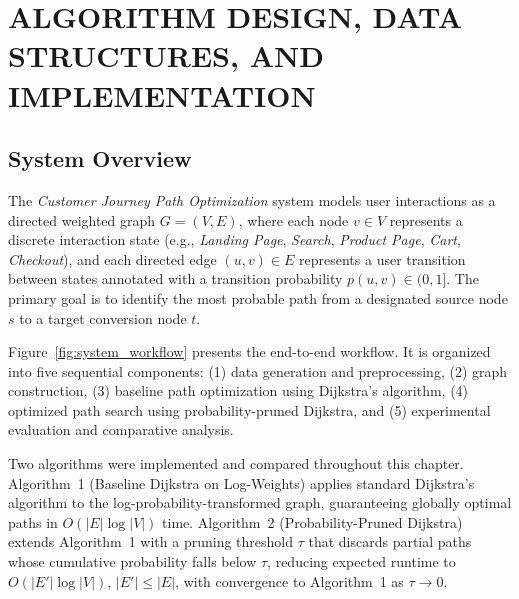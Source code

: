 \chapter{ALGORITHM DESIGN, DATA STRUCTURES, AND IMPLEMENTATION}\label{chap:methodology}

\section{System Overview}

The \textit{Customer Journey Path Optimization} system models user interactions as a directed weighted graph $G = (V, E)$, where each node $v \in V$ represents a discrete interaction state (e.g., \textit{Landing Page}, \textit{Search}, \textit{Product Page}, \textit{Cart}, \textit{Checkout}), and each directed edge $(u,v) \in E$ represents a user transition between states annotated with a transition probability $p(u,v) \in (0,1]$. The primary goal is to identify the most probable path from a designated source node $s$ to a target conversion node $t$.

Figure~\ref{fig:system_workflow} presents the end-to-end workflow. It is organized into five sequential components: (1) data generation and preprocessing, (2) graph construction, (3) baseline path optimization using Dijkstra's algorithm, (4) optimized path search using probability-pruned Dijkstra, and (5) experimental evaluation and comparative analysis.

Two algorithms were implemented and compared throughout this chapter. Algorithm~1 (Baseline Dijkstra on Log-Weights) applies standard Dijkstra's algorithm to the log-probability-transformed graph, guaranteeing globally optimal paths in $O(|E|\log|V|)$ time. Algorithm~2 (Probability-Pruned Dijkstra) extends Algorithm~1 with a pruning threshold $\tau$ that discards partial paths whose cumulative probability falls below $\tau$, reducing expected runtime to $O(|E'|\log|V|)$, $|E'| \leq |E|$, with convergence to Algorithm~1 as $\tau \to 0$.

